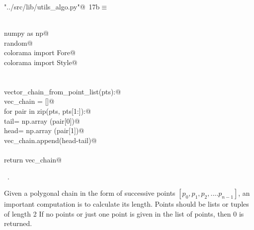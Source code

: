\documentclass[11.5pt]{report}
\begin{document}
\begin{flushleft} \small\label{scrap11}\raggedright\small
{} \verb@"../src/lib/utils_algo.py"@\nobreak\ {\footnotesize {17b}}$\equiv$
\vspace{-1ex}
\begin{list}{}{} \item
\mbox{}\verb@@\\
\mbox{}\verb@import numpy as np@\\
\mbox{}\verb@import random@\\
\mbox{}\verb@from colorama import Fore@\\
\mbox{}\verb@from colorama import Style@\\
\mbox{}\verb@@\\
\mbox{}\verb@@\\
\mbox{}\verb@def vector_chain_from_point_list(pts):@\\
\mbox{}\verb@    vec_chain = []@\\
\mbox{}\verb@    for pair in zip(pts, pts[1:]):@\\
\mbox{}\verb@        tail= np.array (pair[0])@\\
\mbox{}\verb@        head= np.array (pair[1])@\\
\mbox{}\verb@        vec_chain.append(head-tail)@\\
\mbox{}\verb@@\\
\mbox{}\verb@    return vec_chain@\\
\mbox{}\verb@@{\NWsep}
\end{list}
\vspace{-1.5ex}
\footnotesize
\begin{list}{}{\setlength{\itemsep}{-\parsep}\setlength{\itemindent}{-\leftmargin}}
\item \NWtxtFileDefBy\ .

\item{}
\end{list}
\vspace{4ex}
\end{flushleft}

\newchunk Given a polygonal chain in the form of successive points  $[p_0,p_1,p_2,....p_{n-1}]$, 
an important computation is to calculate its length. Points should be lists or tuples of length 2
If no points or just one point is given in the list of points, then 0 is returned.
\end{document}
